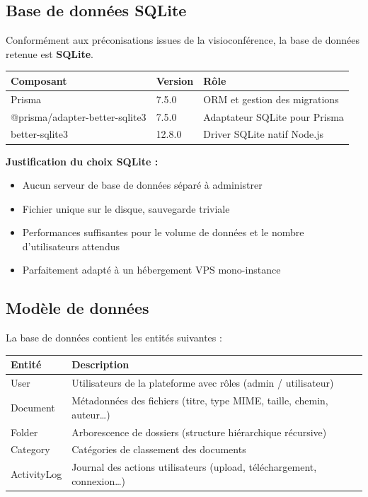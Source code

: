 \documentclass[a4paper,12pt,french]{article}
\begin{document}
\subsection{Base de données SQLite}

Conformément aux préconisations issues de la visioconférence, la base de données retenue est \textbf{SQLite}.

\begin{tabularx}{\textwidth}{l l X}
\toprule
\textbf{Composant} & \textbf{Version} & \textbf{Rôle} \\
\midrule
Prisma & 7.5.0 & ORM et gestion des migrations \\
@prisma/adapter-better-sqlite3 & 7.5.0 & Adaptateur SQLite pour Prisma \\
better-sqlite3 & 12.8.0 & Driver SQLite natif Node.js \\
\bottomrule
\end{tabularx}

\vspace{0.5em}

\textbf{Justification du choix SQLite :}
\begin{itemize}
  \item Aucun serveur de base de données séparé à administrer
  \item Fichier unique sur le disque, sauvegarde triviale
  \item Performances suffisantes pour le volume de données et le nombre d'utilisateurs attendus
  \item Parfaitement adapté à un hébergement VPS mono-instance
\end{itemize}

\subsection{Modèle de données}

La base de données contient les entités suivantes :

\begin{tabularx}{\textwidth}{l X}
\toprule
\textbf{Entité} & \textbf{Description} \\
\midrule
User & Utilisateurs de la plateforme avec rôles (admin / utilisateur) \\
Document & Métadonnées des fichiers (titre, type MIME, taille, chemin, auteur…) \\
Folder & Arborescence de dossiers (structure hiérarchique récursive) \\
Category & Catégories de classement des documents \\
ActivityLog & Journal des actions utilisateurs (upload, téléchargement, connexion…) \\
\bottomrule
\end{tabularx}
\end{document}
